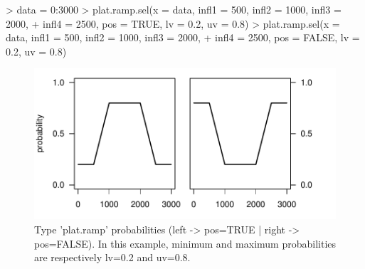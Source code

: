 \documentclass[letterpaper, 12pt]{article}
\begin{document}
\begin{Schunk}
\begin{Sinput}
> data = 0:3000
> plat.ramp.sel(x = data, infl1 = 500, infl2 = 1000, infl3 = 2000, 
+     infl4 = 2500, pos = TRUE, lv = 0.2, uv = 0.8)
> plat.ramp.sel(x = data, infl1 = 500, infl2 = 1000, infl3 = 2000, 
+     infl4 = 2500, pos = FALSE, lv = 0.2, uv = 0.8)
\end{Sinput}
\end{Schunk}
\begin{figure}[h]
\vspace{-20pt}
\begin{center}
\includegraphics{relation_sel-021}
\end{center}
\vspace{-30pt}
\caption{Type 'plat.ramp' probabilities (left -> pos=TRUE |  right -> pos=FALSE). In this example, minimum and maximum probabilities are respectively lv=0.2 and uv=0.8.}
\vspace{-20pt}
\label{fig10}
\end{figure}
\end{document}
